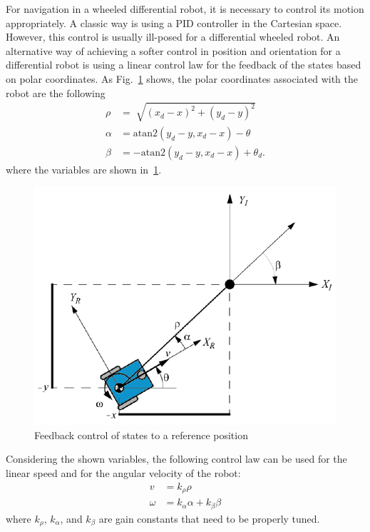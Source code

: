 \documentclass[conference]{IEEEtran}
\begin{document}
For navigation in a wheeled differential robot, it is necessary to control its motion appropriately. A classic way is using a PID controller in the Cartesian space. However, this control is usually ill-posed for a differential wheeled robot.
An alternative way of achieving a softer control in position and orientation for a differential robot is using a linear control law for the feedback of the states based on polar coordinates. As Fig.~\ref{fig:Polar} shows, the polar coordinates associated with the robot are the following
\begin{align*}
  \rho &= \sqrt[]{(x_{d} - x)^2 + (y_{d} - y)^2}  \\
  \alpha &= \text{atan2}(y_{d} - y, x_{d} - x) - \theta  \\
  \beta &= -\text{atan2}(y_{d} - y, x_{d} - x) + \theta_{d}.
\end{align*}
where the variables are shown in~\ref{fig:Polar}. 
\begin{figure}%
 \includegraphics[width=0.5\linewidth]{control_polar.png}
 \centering\caption{Feedback control of states to a reference position}
 \label{fig:Polar}
\end{figure}
Considering the shown variables, the following control law can be used for the linear speed and for the angular velocity of the robot:
\begin{align*}
  v &= k_{\rho}\rho \\
  \omega &= k_{\alpha}\alpha + k_{\beta}\beta
\end{align*}
where $k_{\rho}$, $k_{\alpha}$, and $k_{\beta}$ are gain constants that need to be properly tuned.
\end{document}
